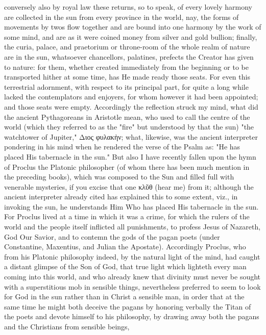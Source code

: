 \documentclass{article}
\begin{document}
conversely also by royal law these returns, so to speak, of every lovely
harmony are collected in the sun from every province in the world, nay,
the forms of movements by twos flow together and are bound into one
harmony by the work of some mind, and are as it were coined money
from silver and gold bullion; finally, the curia, palace, and praetorium or
throne-room of the whole realm of nature are in the sun, whatsoever
chancellors, palatines, prefects the Creator has given to nature: for them,
whether created immediately from the beginning or to be transported
hither at some time, has He made ready those seats. For even this
terrestrial adornment, with respect to its principal part, for quite a long
while lacked the contemplators and enjoyers, for whom however it had
been appointed; and those seats were empty. Accordingly the reflection
struck my mind, what did the ancient Pythagoreans in Aristotle mean,
who used to call the centre of the world (which they referred to as the
"fire" but understood by that the sun) "the watchtower of Jupiter," Διος
φυλακὴν; what, likewise, was the ancient interpreter pondering in his
mind when he rendered the verse of the Psalm as: "He has placed His
tabernacle in the sun."
But also I have recently fallen upon the hymn of Proclus the Platonic
philosopher (of whom there has been much mention in the preceding
books), which was composed to the Sun and filled full with venerable
mysteries, if you excise that one κλῦθ (hear me) from it; although the
ancient interpreter already cited has explained this to some extent, viz.,
in invoking the sun, he understands Him Who has placed His tabernacle
in the sun. For Proclus lived at a time in which it was a crime, for which
the rulers of the world and the people itself inflicted all punishments, to
profess Jesus of Nazareth, God Our Savior, and to contemn the gods of
the pagan poets (under Constantine, Maxentius, and Julian the
Apostate). Accordingly Proclus, who from his Platonic philosophy
indeed, by the natural light of the mind, had caught a distant glimpse of
the Son of God, that true light which lighteth every man coming into this
world, and who already knew that divinity must never be sought with a
superstitious mob in sensible things, nevertheless preferred to seem to
look for God in the sun rather than in Christ a sensible man, in order
that at the same time he might both deceive the pagans by honoring
verbally the Titan of the poets and devote himself to his philosophy, by
drawing away both the pagans and the Christians from sensible beings,
\end{document}
